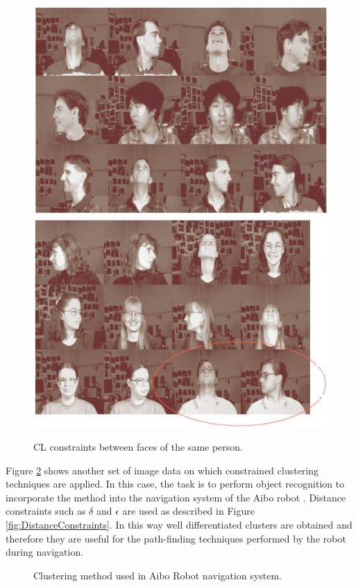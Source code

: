 \begin{figure}[bth]
	\myfloatalign
	{\includegraphics[width=.35\linewidth]{gfx/ConstClust/AnalisisImagenes/CarasDifOr1}} \quad
	{\includegraphics[width=.35\linewidth]{gfx/ConstClust/AnalisisImagenes/CarasDifOr2}}
	\caption[\acs{CL} constraints between faces of the same person.]{\acs{CL} constraints between faces of the same person. \cite{davidson2007survey}}\label{fig:FacesDatabaseCL}
\end{figure}

Figure \ref{fig:AiboRobotClustSys} shows another set of image data on which constrained clustering techniques are applied. In this case, the task is to perform object recognition to incorporate the method into the navigation system of the Aibo robot \cite{davidson2005clustering}. Distance constraints such as $\delta$ and $\epsilon$ are used as described in Figure \ref{fig:DistanceConstraints}. In this way well differentiated clusters are obtained and therefore they are useful for the path-finding techniques performed by the robot during navigation.

\begin{figure}[bth]
	\myfloatalign
	 \quad
	 \quad
	 \quad
	\caption[Clustering method used in Aibo Robot navigation system.]{Clustering method used in Aibo Robot navigation system. \cite{davidson2007survey}\cite{davidson2005clustering}}\label{fig:AiboRobotClustSys}
\end{figure}

